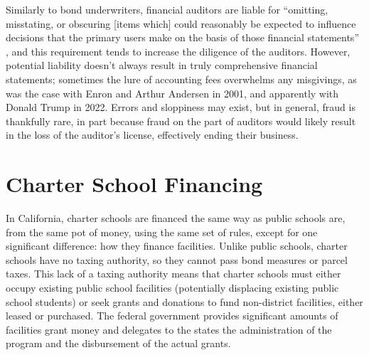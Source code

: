 Similarly to bond underwriters, financial auditors are liable for ``omitting, misstating, or obscuring [items which] could reasonably be expected to influence decisions that the primary users make on the basis of those financial statements'' \parencite{Cayamanda2020}, and this requirement tends to increase the diligence of the auditors. However, potential liability doesn't always result in truly comprehensive financial statements; sometimes the lure of accounting fees overwhelms any misgivings, as was the case with Enron and Arthur Andersen in 2001, and apparently with Donald Trump in 2022. Errors and sloppiness may exist, but in general, fraud is thankfully rare, in part because fraud on the part of auditors would likely result in the loss of the auditor's license, effectively ending their business. 

\section{Charter School Financing}\label{sec:charter-school-financing}\indent

In California, charter schools are financed the same way as public schools are, from the same pot of money, using the same set of rules, except for one significant difference: how they finance facilities. Unlike public schools, charter schools have no taxing authority, so they cannot pass bond measures or parcel taxes. This lack of a taxing authority means that charter schools must either occupy existing public school facilities (potentially displacing existing public school students) or seek grants and donations to fund non-district facilities, either leased or purchased. The federal government provides significant amounts of facilities grant money and delegates to the states the administration of the program and the disbursement of the actual grants. 

